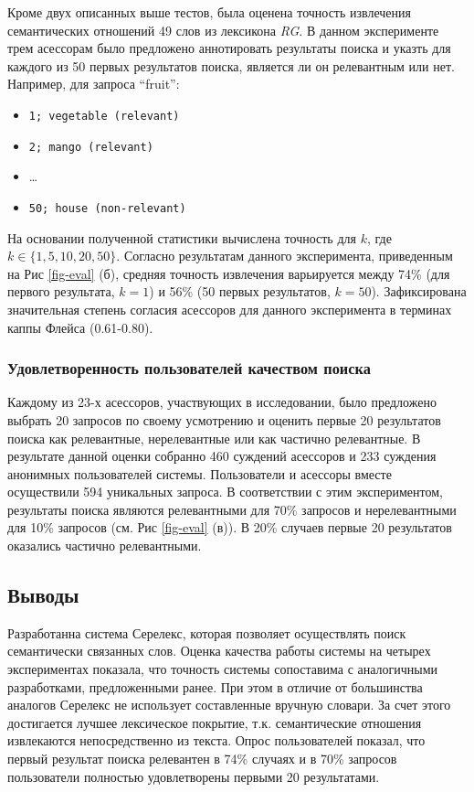 \documentclass[a4paper,10pt,twoside]{article}
\begin{document}
Кроме двух описанных выше тестов, была оценена точность извлечения семантических отношений 49 слов из лексикона \textit{RG}. В данном эксперименте трем асессорам было предложено аннотировать результаты поиска и указть для каждого из 50 первых результатов поиска, является ли он релевантным или нет. Например, для запроса ``fruit'':

\begin{itemize}
  \footnotesize
  \item \texttt{1; vegetable (relevant)}
  \item \texttt{2; mango (relevant)}
  \item \ldots
  \item \texttt{50; house (non-relevant)}
\end{itemize} 

На основании полученной статистики вычислена точность для $k$, где $k \in \{1, 5, 10, 20, 50\}$. Согласно результатам данного эксперимента, приведенным на Рис \ref{fig-eval} (б), средняя точность извлечения варьируется между 74\% (для первого результата, $k=1$) и 56\% (50 первых результатов, $k=50$). Зафиксирована значительная степень согласия асессоров для данного эксперимента в терминах каппы Флейса (0.61-0.80).


\subsubsection{Удовлетворенность пользователей качеством поиска} Каждому из 23-х асессоров, участвующих в исследовании, было предложено выбрать 20 запросов по своему усмотрению и оценить первые 20 результатов поиска как релевантные, нерелевантные или как частично релевантные. В результате данной оценки собранно 460 суждений асессоров и 233 суждения анонимных пользователей системы. Пользователи и асессоры вместе осуществили 594 уникальных запроса. В соответствии с этим экспериментом, результаты поиска являются релевантными для 70\% запросов и нерелевантными для 10\% запросов (см. Рис \ref{fig-eval} (в)). В 20\% случаев первые 20 результатов оказались частично релевантными.

\subsection{Выводы}

Разработанна система Серелекс, которая позволяет осуществлять поиск семантически связанных слов. Оценка качества работы системы на четырех экспериментах показала, что точность системы сопоставима с аналогичными разработками, предложенными ранее. При этом в отличие от большинства аналогов Серелекс не использует составленные вручную словари. За счет этого достигается лучшее лексическое покрытие, т.к. семантические отношения извлекаются непосредственно из текста. Опрос пользователей показал, что первый результат поиска релевантен в 74\% случаях и в 70\% запросов пользователи полностью удовлетворены первыми 20 результатами.   



\end{document}
